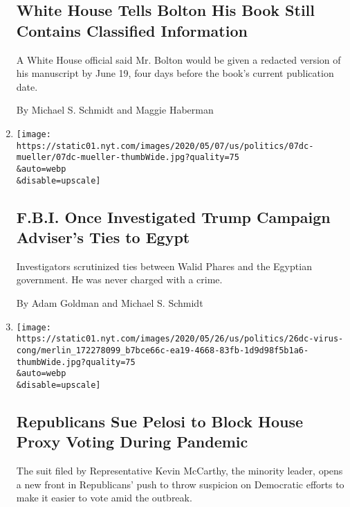 \begin{enumerate}
{  \subsection{White House Tells Bolton His Book Still Contains
  Classified
  Information}\label{white-house-tells-bolton-his-book-still-contains-classified-information}}

  A White House official said Mr. Bolton would be given a redacted
  version of his manuscript by June 19, four days before the book's
  current publication date.

  By Michael S. Schmidt and Maggie Haberman
\item
  \href{/2020/05/28/us/politics/mueller-walid-phares.html}{}

  \texttt{[image: https://static01.nyt.com/images/2020/05/07/us/politics/07dc-mueller/07dc-mueller-thumbWide.jpg?quality=75\\\&auto=webp\\\&disable=upscale]}

  \hypertarget{fbi-once-investigated-trump-campaign-advisers-ties-to-egypt}{%
  \subsection{F.B.I. Once Investigated Trump Campaign Adviser's Ties to
  Egypt}\label{fbi-once-investigated-trump-campaign-advisers-ties-to-egypt}}

  Investigators scrutinized ties between Walid Phares and the Egyptian
  government. He was never charged with a crime.

  By Adam Goldman and Michael S. Schmidt
\item
  \href{/2020/05/26/us/politics/house-lawsuit-proxy-voting-coronavirus.html}{}

  \texttt{[image: https://static01.nyt.com/images/2020/05/26/us/politics/26dc-virus-cong/merlin\_172278099\_b7bce66c-ea19-4668-83fb-1d9d98f5b1a6-thumbWide.jpg?quality=75\\\&auto=webp\\\&disable=upscale]}

  \hypertarget{republicans-sue-pelosi-to-block-house-proxy-voting-during-pandemic}{%
  \subsection{Republicans Sue Pelosi to Block House Proxy Voting During
  Pandemic}\label{republicans-sue-pelosi-to-block-house-proxy-voting-during-pandemic}}

  The suit filed by Representative Kevin McCarthy, the minority leader,
  opens a new front in Republicans' push to throw suspicion on
  Democratic efforts to make it easier to vote amid the outbreak.


\end{enumerate}

